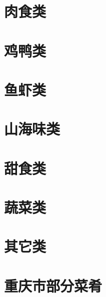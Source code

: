 \documentclass{cookbook}
\begin{document}
\begin{cookbook}


\section{肉食类}

\section{鸡鸭类}
\section{鱼虾类}
\section{山海味类}
\section{甜食类}
\section{蔬菜类}
\section{其它类}
\section{重庆市部分菜肴}

\end{cookbook}
\end{document}
